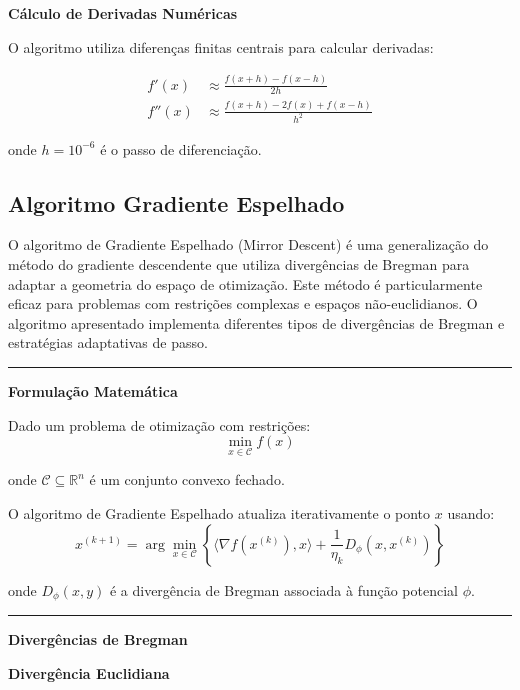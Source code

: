 \documentclass[12pt,a4paper]{article}
\begin{document}
\vspace{1cm}
\textbf{Cálculo de Derivadas Numéricas}

O algoritmo utiliza diferenças finitas centrais para calcular derivadas:

\begin{align}
f'(x) &\approx \frac{f(x+h) - f(x-h)}{2h} \\
f''(x) &\approx \frac{f(x+h) - 2f(x) + f(x-h)}{h^2}
\end{align}

onde $h = 10^{-6}$ é o passo de diferenciação.


\subsection{Algoritmo Gradiente Espelhado}


O algoritmo de Gradiente Espelhado (Mirror Descent) é uma generalização do método do gradiente descendente que utiliza divergências de Bregman para adaptar a geometria do espaço de otimização. Este método é particularmente eficaz para problemas com restrições complexas e espaços não-euclidianos. O algoritmo apresentado implementa diferentes tipos de divergências de Bregman e estratégias adaptativas de passo.

\vspace{0.5cm}
\hrule
\vspace{0.5cm}

\textbf{Formulação Matemática}

Dado um problema de otimização com restrições:
\begin{equation}
\min_{x \in \mathcal{C}} f(x)
\end{equation}

onde $\mathcal{C} \subseteq \mathbb{R}^n$ é um conjunto convexo fechado.

O algoritmo de Gradiente Espelhado atualiza iterativamente o ponto $x$ usando:
\begin{equation}
x^{(k+1)} = \arg\min_{x \in \mathcal{C}} \left\{ \langle \nabla f(x^{(k)}), x \rangle + \frac{1}{\eta_k} D_{\phi}(x, x^{(k)}) \right\}
\end{equation}

onde $D_{\phi}(x, y)$ é a divergência de Bregman associada à função potencial $\phi$.

\vspace{0.5cm}\hrule\vspace{0.5cm}\textbf{Divergências de Bregman}

\textbf{Divergência Euclidiana}
\end{document}

